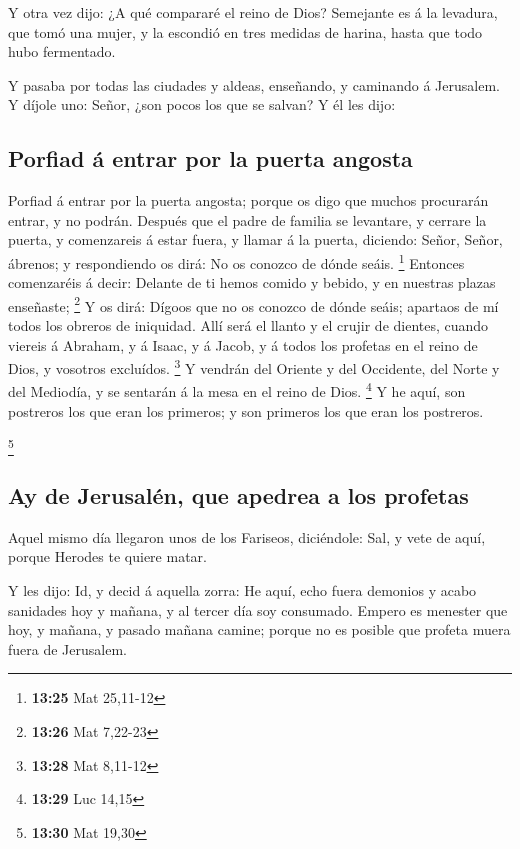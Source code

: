  Y otra vez dijo: ¿A qué compararé el reino de Dios?
 Semejante es á la levadura, que tomó una mujer, y la
escondió en tres medidas de harina, hasta que todo hubo fermentado.

 Y pasaba por todas las ciudades y aldeas, enseñando, y
caminando á Jerusalem.  Y díjole uno: Señor, ¿son pocos los
que se salvan? Y él les dijo:

\hypertarget{porfiad-uxe1-entrar-por-la-puerta-angosta}{%
\subsection{Porfiad á entrar por la puerta
angosta}\label{porfiad-uxe1-entrar-por-la-puerta-angosta}}

 Porfiad á entrar por la puerta angosta; porque os digo que
muchos procurarán entrar, y no podrán.  Después que el
padre de familia se levantare, y cerrare la puerta, y comenzareis á
estar fuera, y llamar á la puerta, diciendo: Señor, Señor, ábrenos; y
respondiendo os dirá: No os conozco de dónde seáis. \footnote{\textbf{13:25}
  Mat 25,11-12}  Entonces comenzaréis á decir: Delante de
ti hemos comido y bebido, y en nuestras plazas enseñaste; \footnote{\textbf{13:26}
  Mat 7,22-23}  Y os dirá: Dígoos que no os conozco de
dónde seáis; apartaos de mí todos los obreros de iniquidad.
 Allí será el llanto y el crujir de dientes, cuando viereis
á Abraham, y á Isaac, y á Jacob, y á todos los profetas en el reino de
Dios, y vosotros excluídos. \footnote{\textbf{13:28} Mat 8,11-12}
 Y vendrán del Oriente y del Occidente, del Norte y del
Mediodía, y se sentarán á la mesa en el reino de Dios. \footnote{\textbf{13:29}
  Luc 14,15}  Y he aquí, son postreros los que eran los
primeros; y son primeros los que eran los postreros.

\footnote{\textbf{13:30} Mat 19,30}

\hypertarget{ay-de-jerusaluxe9n-que-apedrea-a-los-profetas}{%
\subsection{Ay de Jerusalén, que apedrea a los
profetas}\label{ay-de-jerusaluxe9n-que-apedrea-a-los-profetas}}

 Aquel mismo día llegaron unos de los Fariseos, diciéndole:
Sal, y vete de aquí, porque Herodes te quiere matar.

 Y les dijo: Id, y decid á aquella zorra: He aquí, echo
fuera demonios y acabo sanidades hoy y mañana, y al tercer día soy
consumado.  Empero es menester que hoy, y mañana, y pasado
mañana camine; porque no es posible que profeta muera fuera de
Jerusalem.

